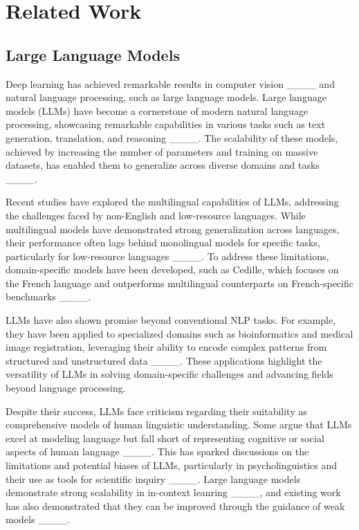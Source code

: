 \section{Related Work}
\subsection{Large Language Models}
Deep learning has achieved remarkable results in computer vision ____ and natural language processing, such as large language models.
Large language models (LLMs) have become a cornerstone of modern natural language processing, showcasing remarkable capabilities in various tasks such as text generation, translation, and reasoning ____. The scalability of these models, achieved by increasing the number of parameters and training on massive datasets, has enabled them to generalize across diverse domains and tasks ____.

Recent studies have explored the multilingual capabilities of LLMs, addressing the challenges faced by non-English and low-resource languages. While multilingual models have demonstrated strong generalization across languages, their performance often lags behind monolingual models for specific tasks, particularly for low-resource languages ____. To address these limitations, domain-specific models have been developed, such as Cedille, which focuses on the French language and outperforms multilingual counterparts on French-specific benchmarks ____.

LLMs have also shown promise beyond conventional NLP tasks. For example, they have been applied to specialized domains such as bioinformatics and medical image registration, leveraging their ability to encode complex patterns from structured and unstructured data ____. These applications highlight the versatility of LLMs in solving domain-specific challenges and advancing fields beyond language processing.

Despite their success, LLMs face criticism regarding their suitability as comprehensive models of human linguistic understanding. Some argue that LLMs excel at modeling language but fall short of representing cognitive or social aspects of human language ____. This has sparked discussions on the limitations and potential biases of LLMs, particularly in psycholinguistics and their use as tools for scientific inquiry ____.
Large language models demonstrate strong scalability in in-context leanring ____, and existing work has also demonstrated that they can be improved through the guidance of weak models ____.

